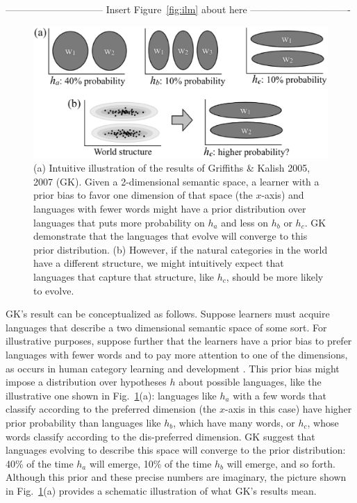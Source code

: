 \documentclass{apa}
\begin{document}
\vspace{5mm}
------------------------------ Insert Figure~\ref{fig:ilm} about here -------------------------------
\vspace{5mm}

\begin{figure}
\begin{center}
\includegraphics[scale=0.45]{circles.eps}
\end{center}
\vspace{-5mm}
\caption{(a) Intuitive illustration of the results of Griffiths \& Kalish 2005, 2007 (GK). Given a 2-dimensional semantic space, a learner with a prior bias to favor one dimension of that space (the $x$-axis) and languages with fewer words might have a prior distribution over languages that puts more probability on $h_a$ and less on $h_b$ or $h_c$. GK demonstrate that the languages that evolve will converge to this prior distribution. (b) However, if the natural categories in the world have a different structure, we might intuitively expect that languages that capture that structure, like $h_c$, should be more likely to evolve.}
\label{fig:circles}
\end{figure}


GK's result can be conceptualized as follows. Suppose learners must acquire languages that describe a two dimensional semantic space of some sort. For illustrative purposes, suppose further that the learners have a prior bias to prefer languages with fewer words and to pay more attention to one of the dimensions, as occurs in human category learning and development \cite{landauetal88}.  This prior bias might impose a distribution over hypotheses $h$ about possible languages, like the illustrative one shown in Fig.~\ref{fig:circles}(a): languages like $h_a$ with a few words that classify according to the preferred dimension (the $x$-axis in this case) have higher prior probability than languages like $h_b$, which have many words, or $h_c$, whose words classify according to the dis-preferred dimension. GK suggest that languages evolving to describe this space will converge to the prior distribution: 40\% of the time $h_a$ will emerge, 10\% of the time $h_b$ will emerge, and so forth. Although this prior and these precise numbers are imaginary, the picture shown in Fig.~\ref{fig:circles}(a) provides a schematic illustration of what GK's results mean.
\end{document}
